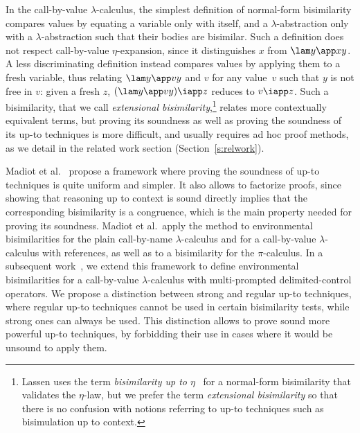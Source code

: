 \documentclass{lmcs}
\theoremstyle{defC}
\begin{document}
In the call-by-value $\lambda$-calculus, the simplest definition of normal-form
bisimilarity compares values by equating a variable only with itself, and a
$\lambda$-abstraction only with a $\lambda$-abstraction such that their bodies
are bisimilar. Such a definition does not respect call-by-value
$\eta$-expansion, since it distinguishes $x$ from $\lam y {\app x y}$. A less
discriminating definition instead compares values by applying them to a fresh
variable, thus relating $\lam y {\app v y}$ and $v$ for any value~$v$ such that
$y$ is not free in $v$: given a fresh $z$, $(\lam y {\app v y}) \iapp z$ reduces
to $v \iapp z$. Such a bisimilarity, that we call \textit{extensional
  bisimilarity},\footnote{Lassen uses the term \textit{bisimilarity up to
    $\eta$}~\cite{Lassen:MFPS99} for a normal-form bisimilarity that validates
  the $\eta$-law, but we prefer the term \textit{extensional bisimilarity} so that
  there is no confusion with notions referring to up-to techniques such as
  bisimulation up to context.}  relates more contextually equivalent terms, but
proving its soundness as well as proving the soundness of its up-to techniques
is more difficult, and usually requires ad hoc proof methods, as we detail in
the related work section (Section~\ref{s:relwork}).

Madiot et al.~\cite{Madiot-al:CONCUR14} propose a framework where proving the
soundness of up-to techniques is quite uniform and simpler. It also allows to
factorize proofs, since showing that reasoning up to context is sound
directly implies that the corresponding bisimilarity is a congruence, which is
the main property needed for proving its soundness. Madiot et al.\ apply the
method to environmental bisimilarities for the plain call-by-name
$\lambda$-calculus and for a call-by-value $\lambda$-calculus with references,
as well as to a bisimilarity for the $\pi$-calculus. In a subsequent
work~\cite{Aristizabal-al:FSCD16}, we extend this framework to define
environmental bisimilarities for a call-by-value $\lambda$-calculus with
multi-prompted delimited-control operators. We propose a distinction between
strong and regular up-to techniques, where regular up-to techniques cannot be
used in certain bisimilarity tests, while strong ones can always be used. This
distinction allows to prove sound more powerful up-to techniques, by forbidding
their use in cases where it would be unsound to apply them.
\end{document}
